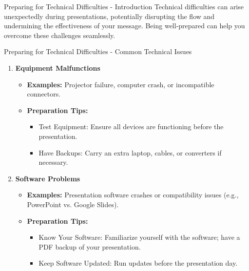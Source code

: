 \documentclass[aspectratio=169]{beamer}
\begin{document}
\begin{frame}[fragile]{Preparing for Technical Difficulties - Introduction}
    Technical difficulties can arise unexpectedly during presentations, potentially disrupting the flow and undermining the effectiveness of your message. Being well-prepared can help you overcome these challenges seamlessly.
\end{frame}

\begin{frame}[fragile]{Preparing for Technical Difficulties - Common Technical Issues}
    \begin{enumerate}
        \item \textbf{Equipment Malfunctions}
        \begin{itemize}
            \item \textbf{Examples:} Projector failure, computer crash, or incompatible connectors.
            \item \textbf{Preparation Tips:}
            \begin{itemize}
                \item Test Equipment: Ensure all devices are functioning before the presentation.
                \item Have Backups: Carry an extra laptop, cables, or converters if necessary.
            \end{itemize}
        \end{itemize}
        
        \item \textbf{Software Problems}
        \begin{itemize}
            \item \textbf{Examples:} Presentation software crashes or compatibility issues (e.g., PowerPoint vs. Google Slides).
            \item \textbf{Preparation Tips:}
            \begin{itemize}
                \item Know Your Software: Familiarize yourself with the software; have a PDF backup of your presentation.
                \item Keep Software Updated: Run updates before the presentation day.
            \end{itemize}
        \end{itemize}
        

\end{enumerate}
\end{frame}
\end{document}
